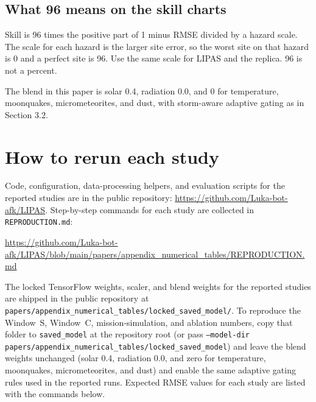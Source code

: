 \subsection*{What 96 means on the skill charts}
Skill is 96 times the positive part of 1 minus RMSE divided by a hazard scale. The scale for each hazard is the larger site error, so the worst site on that hazard is 0 and a perfect site is 96. Use the same scale for LIPAS and the replica. 96 is not a percent.

The blend in this paper is solar 0.4, radiation 0.0, and 0 for temperature, moonquakes, micrometeorites, and dust, with storm-aware adaptive gating as in Section 3.2.

\section{How to rerun each study}

Code, configuration, data-processing helpers, and evaluation scripts for the reported studies are in the public repository: \url{https://github.com/Luka-bot-afk/LIPAS}. Step-by-step commands for each study are collected in \texttt{REPRODUCTION.md}:

\url{https://github.com/Luka-bot-afk/LIPAS/blob/main/papers/appendix_numerical_tables/REPRODUCTION.md}

The locked TensorFlow weights, scaler, and blend weights for the reported studies are shipped in the public repository at \texttt{papers/appendix\_numerical\_tables/locked\_saved\_model/}. To reproduce the Window~S, Window~C, mission-simulation, and ablation numbers, copy that folder to \texttt{saved\_model} at the repository root (or pass \texttt{--model-dir papers/appendix\_numerical\_tables/locked\_saved\_model}) and leave the blend weights unchanged (solar 0.4, radiation 0.0, and zero for temperature, moonquakes, micrometeorites, and dust) and enable the same adaptive gating rules used in the reported runs. Expected RMSE values for each study are listed with the commands below.

